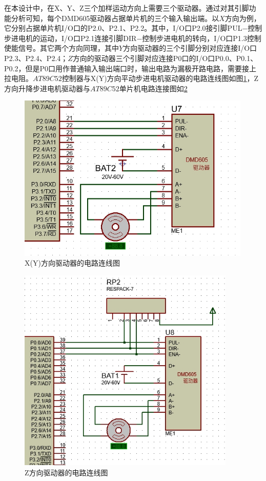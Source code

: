在本设计中，在X、Y、Z三个加样运动方向上需要三个驱动器。通过对其引脚功能分析可知，每个DMD605驱动器占据单片机的三个输入输出端。以$X$方向为例，它分别占据单片机I/O口的P2.0、P2.1、P2.2。其中，I/O口P2.0接引脚PUL$-$控制步进电机的运动，I/O口P2.1连接引脚DIR$-$控制步进电机的转向，I/O口P1.3控制使能信号。其它两个方向同理，其中$Y$方向驱动器的三个引脚分别对应连接I/O口P2.3、P2.4、P2.4；$Z$方向的驱动器三个引脚对应连接P0口的I/O口P0.0、P0.1、P0.2，但是P0口用作普通输入输出端口时，输出电路为漏极开路电路，需要接上拉电阻\supercite{bib15}。$AT89C52$控制器与X(Y)方向平动步进电机驱动器的电路连线图如图\ref{fig:5-2}，Z方向升降步进电机驱动器与$AT89C52$单片机电路连接图如\ref{fig:5-3}
\begin{figure}[htbp!]
	\centering
	\includegraphics[height=8.0cm]{chap/figure/6-3.jpg}
	\caption{X(Y)方向驱动器的电路连线图}
	\label{fig:5-2}
\end{figure}

\begin{figure}[htbp!]
	\centering
	\includegraphics[height=9.8cm]{chap/figure/6-4.jpg}
	\caption{Z方向驱动器的电路连线图}
	\label{fig:5-3}
\end{figure}

